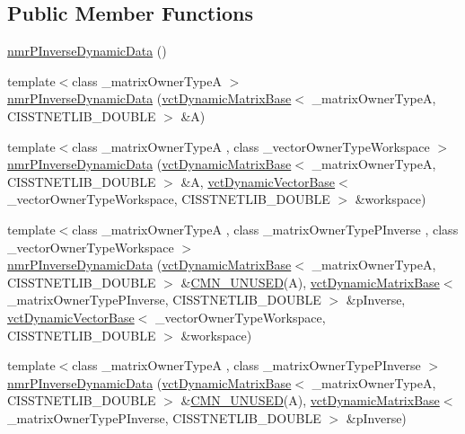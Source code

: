 \subsection*{Public Member Functions}
\begin{DoxyCompactItemize}
\item 
\hyperlink{classnmr_p_inverse_dynamic_data_a3855d7122f40063562732a47c3674584}{nmr\+P\+Inverse\+Dynamic\+Data} ()
\item 
{\footnotesize template$<$class \+\_\+matrix\+Owner\+Type\+A $>$ }\\\hyperlink{classnmr_p_inverse_dynamic_data_abf2e6f7bab95820340d2356afc2bb3a9}{nmr\+P\+Inverse\+Dynamic\+Data} (\hyperlink{classvct_dynamic_matrix_base}{vct\+Dynamic\+Matrix\+Base}$<$ \+\_\+matrix\+Owner\+Type\+A, C\+I\+S\+S\+T\+N\+E\+T\+L\+I\+B\+\_\+\+D\+O\+U\+B\+L\+E $>$ \&A)
\item 
{\footnotesize template$<$class \+\_\+matrix\+Owner\+Type\+A , class \+\_\+vector\+Owner\+Type\+Workspace $>$ }\\\hyperlink{classnmr_p_inverse_dynamic_data_ad2e500bdfc629c4a9daae81e641557b5}{nmr\+P\+Inverse\+Dynamic\+Data} (\hyperlink{classvct_dynamic_matrix_base}{vct\+Dynamic\+Matrix\+Base}$<$ \+\_\+matrix\+Owner\+Type\+A, C\+I\+S\+S\+T\+N\+E\+T\+L\+I\+B\+\_\+\+D\+O\+U\+B\+L\+E $>$ \&A, \hyperlink{classvct_dynamic_vector_base}{vct\+Dynamic\+Vector\+Base}$<$ \+\_\+vector\+Owner\+Type\+Workspace, C\+I\+S\+S\+T\+N\+E\+T\+L\+I\+B\+\_\+\+D\+O\+U\+B\+L\+E $>$ \&workspace)
\item 
{\footnotesize template$<$class \+\_\+matrix\+Owner\+Type\+A , class \+\_\+matrix\+Owner\+Type\+P\+Inverse , class \+\_\+vector\+Owner\+Type\+Workspace $>$ }\\\hyperlink{classnmr_p_inverse_dynamic_data_a943d503dccef08a64b5183025c8f7cce}{nmr\+P\+Inverse\+Dynamic\+Data} (\hyperlink{classvct_dynamic_matrix_base}{vct\+Dynamic\+Matrix\+Base}$<$ \+\_\+matrix\+Owner\+Type\+A, C\+I\+S\+S\+T\+N\+E\+T\+L\+I\+B\+\_\+\+D\+O\+U\+B\+L\+E $>$ \&\hyperlink{cmn_portability_8h_a021894e2626935fa2305434b1e893ff6}{C\+M\+N\+\_\+\+U\+N\+U\+S\+E\+D}(A), \hyperlink{classvct_dynamic_matrix_base}{vct\+Dynamic\+Matrix\+Base}$<$ \+\_\+matrix\+Owner\+Type\+P\+Inverse, C\+I\+S\+S\+T\+N\+E\+T\+L\+I\+B\+\_\+\+D\+O\+U\+B\+L\+E $>$ \&p\+Inverse, \hyperlink{classvct_dynamic_vector_base}{vct\+Dynamic\+Vector\+Base}$<$ \+\_\+vector\+Owner\+Type\+Workspace, C\+I\+S\+S\+T\+N\+E\+T\+L\+I\+B\+\_\+\+D\+O\+U\+B\+L\+E $>$ \&workspace)
\item 
{\footnotesize template$<$class \+\_\+matrix\+Owner\+Type\+A , class \+\_\+matrix\+Owner\+Type\+P\+Inverse $>$ }\\\hyperlink{classnmr_p_inverse_dynamic_data_ab8b48497e09b286b9f1db40e751b1ca5}{nmr\+P\+Inverse\+Dynamic\+Data} (\hyperlink{classvct_dynamic_matrix_base}{vct\+Dynamic\+Matrix\+Base}$<$ \+\_\+matrix\+Owner\+Type\+A, C\+I\+S\+S\+T\+N\+E\+T\+L\+I\+B\+\_\+\+D\+O\+U\+B\+L\+E $>$ \&\hyperlink{cmn_portability_8h_a021894e2626935fa2305434b1e893ff6}{C\+M\+N\+\_\+\+U\+N\+U\+S\+E\+D}(A), \hyperlink{classvct_dynamic_matrix_base}{vct\+Dynamic\+Matrix\+Base}$<$ \+\_\+matrix\+Owner\+Type\+P\+Inverse, C\+I\+S\+S\+T\+N\+E\+T\+L\+I\+B\+\_\+\+D\+O\+U\+B\+L\+E $>$ \&p\+Inverse)

\end{DoxyCompactItemize}
